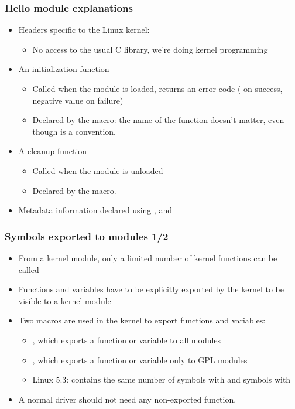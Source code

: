 \begin{frame}
  \frametitle{Hello module explanations}
  \begin{itemize}
  \item Headers specific to the Linux kernel: 
    \begin{itemize}
    \item No access to the usual C library, we're doing kernel
      programming
    \end{itemize}
  \item An initialization function
    \begin{itemize}
    \item Called when the module is loaded, returns an error code
      ( on success, negative value on failure)
    \item Declared by the  macro: the name of the
      function doesn't matter, even though 
      is a convention.
    \end{itemize}
  \item A cleanup function
    \begin{itemize}
    \item Called when the module is unloaded
    \item Declared by the  macro.
    \end{itemize}
  \item Metadata information declared using ,
     and 
  \end{itemize}
\end{frame}

\begin{frame}
  \frametitle{Symbols exported to modules 1/2}
  \begin{itemize}
  \item From a kernel module, only a limited number of kernel
    functions can be called
  \item Functions and variables have to be explicitly exported by the
    kernel to be visible to a kernel module
  \item Two macros are used in the kernel to export functions and
    variables:
    \begin{itemize}
    \item {}, which exports a function
      or variable to all modules
    \item {}, which exports a
      function or variable only to GPL modules
    \item Linux 5.3: contains the same number of symbols with
       and symbols with 
    \end{itemize}
  \item A normal driver should not need any non-exported function.
  \end{itemize}
\end{frame}

